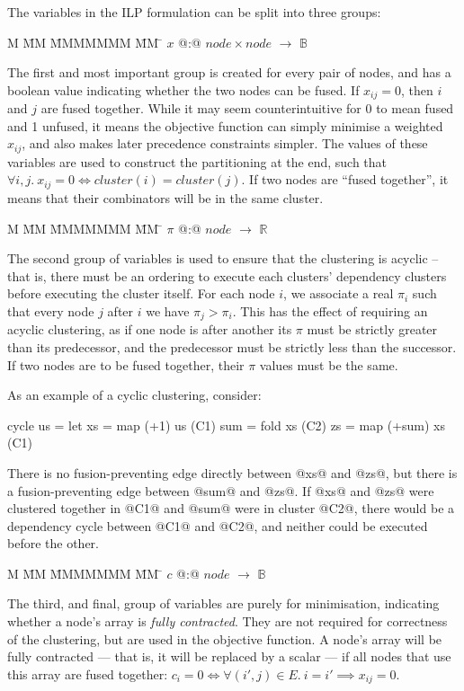 The variables in the ILP formulation can be split into three groups:

\begin{tabbing}
M   \= MM \= MMMMMMM \= MM \= \kill
$x$   \> @:@  \> $node \times node$ \> $\to$ \> $\mathbb{B}$
\end{tabbing}
The first and most important group is created for every pair of nodes, and has a boolean value indicating whether the two nodes can be fused. If $x_{ij} = 0$, then $i$ and $j$ are fused together. While it may seem counterintuitive for 0 to mean fused and 1 unfused, it means the objective function can simply minimise a weighted $x_{ij}$, and also makes later precedence constraints simpler. The values of these variables are used to construct the partitioning at the end, such that $\forall i,j.\ x_{ij} = 0 \iff cluster(i) = cluster(j)$.
If two nodes are ``fused together'', it means that their combinators will be in the same cluster.

\begin{tabbing}
M   \= MM \= MMMMMMM \= MM \= \kill
$\pi$ \> @:@  \> $node$             \> $\to$ \> $\mathbb{R}$
\end{tabbing}
The second group of variables is used to ensure that the clustering is acyclic -- that is, there must be an ordering to execute each clusters' dependency clusters before executing the cluster itself.
For each node $i$, we associate a real $\pi_i$ such that every node $j$ after $i$ we have $\pi_j > \pi_i$. This has the effect of requiring an acyclic clustering, as if one node is after another its $\pi$ must be strictly greater than its predecessor, and the predecessor must be strictly less than the successor. If two nodes are to be fused together, their $\pi$ values must be the same.

As an example of a cyclic clustering, consider:
\begin{code}
cycle us
 = let xs  = map (+1) us          (C1)
       sum = fold xs              (C2)
       zs  = map (+sum) xs        (C1)
\end{code}
There is no fusion-preventing edge directly between @xs@ and @zs@, but there is a fusion-preventing edge between @sum@ and @zs@.
If @xs@ and @zs@ were clustered together in @C1@ and @sum@ were in cluster @C2@, there would be a dependency cycle between @C1@ and @C2@, and neither could be executed before the other.

\begin{tabbing}
M   \= MM \= MMMMMMM \= MM \= \kill
$c$   \> @:@  \> $node$             \> $\to$ \> $\mathbb{B}$
\end{tabbing}
The third, and final, group of variables are purely for minimisation, indicating whether a node's array is \emph{fully contracted}.
They are not required for correctness of the clustering, but are used in the objective function.
A node's array will be fully contracted --- that is, it will be replaced by a scalar --- if all nodes that use this array are fused together: $c_i = 0 \iff \forall (i',j) \in E.\ i = i' \implies x_{ij} = 0$.


